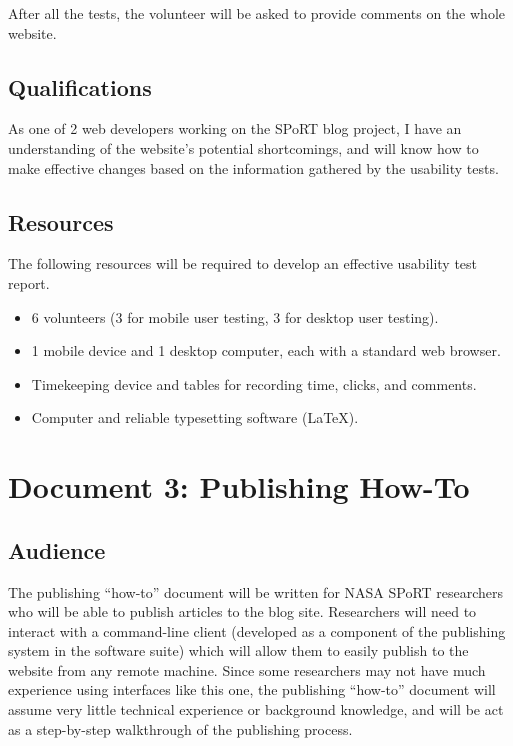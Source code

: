 \documentclass[12pt]{article}
\begin{document}
\noindent
After all the tests, the volunteer will be asked to provide comments on the whole website.

\subsection{Qualifications}

As one of 2 web developers working on the SPoRT blog project, I have an understanding of the website's potential shortcomings, and will know how to make effective changes based on the information gathered by the usability tests.

\subsection{Resources}

The following resources will be required to develop an effective usability test report.

\begin{itemize}
	\item{6 volunteers (3 for mobile user testing, 3 for desktop user testing).}
	\item{1 mobile device and 1 desktop computer, each with a standard web browser.}
	\item{Timekeeping device and tables for recording time, clicks, and comments.}
	\item{Computer and reliable typesetting software (\LaTeX).}
\end{itemize}


\section{Document 3: Publishing How-To}

\subsection{Audience}

The publishing ``how-to'' document will be written for NASA SPoRT researchers who will be able to publish articles to the blog site. Researchers will need to interact with a command-line client (developed as a component of the publishing system in the software suite) which will allow them to easily publish to the website from any remote machine. Since some researchers may not have much experience using interfaces like this one, the publishing ``how-to'' document will assume very little technical experience or background knowledge, and will be act as a step-by-step walkthrough of the publishing process.
\end{document}
